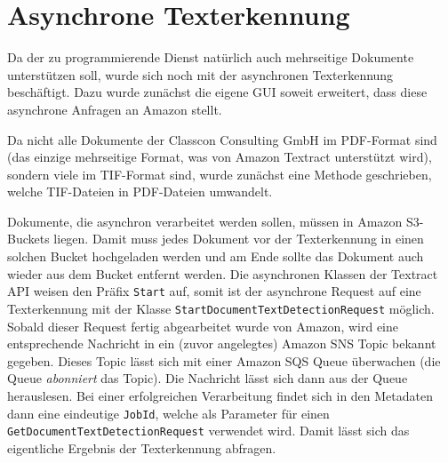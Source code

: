 \documentclass{whswinvcbook}
\begin{document}
\section{Asynchrone Texterkennung}
Da der zu programmierende Dienst natürlich auch mehrseitige Dokumente unterstützen soll, wurde sich noch mit der asynchronen Texterkennung beschäftigt. Dazu wurde zunächst die eigene GUI soweit erweitert, dass diese asynchrone Anfragen an Amazon stellt.

Da nicht alle Dokumente der Classcon Consulting GmbH im PDF-Format sind (das einzige mehrseitige Format, was von Amazon Textract unterstützt wird), sondern viele im TIF-Format sind, wurde zunächst eine Methode geschrieben, welche TIF-Dateien in PDF-Dateien umwandelt.

Dokumente, die asynchron verarbeitet werden sollen, müssen in Amazon S3-Buckets liegen. Damit muss jedes Dokument vor der Texterkennung in einen solchen Bucket hochgeladen werden und am Ende sollte das Dokument auch wieder aus dem Bucket entfernt werden. Die asynchronen Klassen der Textract API weisen den Präfix \texttt{Start} auf, somit ist der asynchrone Request auf eine Texterkennung mit der Klasse \texttt{StartDocumentTextDetectionRequest} möglich. Sobald dieser Request fertig abgearbeitet wurde von Amazon, wird eine entsprechende Nachricht in ein (zuvor angelegtes) Amazon SNS Topic bekannt gegeben. Dieses Topic lässt sich mit einer Amazon SQS Queue überwachen (die Queue \textit{abonniert} das Topic). Die Nachricht lässt sich dann aus der Queue herauslesen. Bei einer erfolgreichen Verarbeitung findet sich in den Metadaten dann eine eindeutige \texttt{JobId}, welche als Parameter für einen \texttt{GetDocumentTextDetectionRequest} verwendet wird. Damit lässt sich das eigentliche Ergebnis der Texterkennung abfragen.
\end{document}
